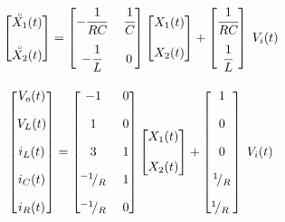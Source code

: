 \documentclass[a4paper,12pt]{article}
\newcommand*\rfrac[2]{{}^{#1}\!/_{#2}}
\begin{document}
            \begin{gather*}
                \begin{bmatrix} \accentset{\circ}{ X_1}(t) \\ \\ \accentset{\circ}{ X_2}(t) \end{bmatrix} =
                    \begin{bmatrix} -\cfrac{1}{RC}  &\; \cfrac{1}{C} \\[10pt] -\cfrac{1}{L} &\; 0 \end{bmatrix} 
                    \begin{bmatrix} X_1(t) \\\\  X_2(t) \end{bmatrix}
                    + \begin{bmatrix} \cfrac{1}{RC} \\[10pt] \cfrac{1}{L} \end{bmatrix} \; V_i(t)
                \\[10pt]
                \begin{bmatrix} V_o(t) \\[10pt] V_L(t) \\[10pt] i_L(t) \\[10pt] i_C(t) \\[10pt] i_R(t) \end{bmatrix} = 
                    \begin{bmatrix} -1 &\; 0 \\[10pt] 1 &\; 0 \\[10pt] 3 &\; 1 \\[10pt] \rfrac{-1}{R} &\; 1 \\[10pt] \rfrac{-1}{R} &\; 0 \end{bmatrix}
                    \begin{bmatrix} X_1(t) \\\\  X_2(t) \end{bmatrix}
                    + \begin{bmatrix} 1 \\[10pt] 0 \\[10pt] 0 \\[10pt] \rfrac{1}{R} \\[10pt] \rfrac{1}{R}\; \end{bmatrix} \; V_i(t)
            \end{gather*}
\end{document}
